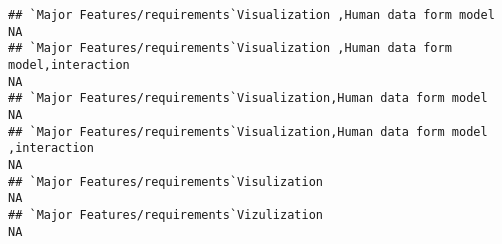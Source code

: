 \documentclass[]{article}
\begin{document}
\begin{verbatim}
## `Major Features/requirements`Visualization ,Human data form model                                                                                                                                                                                                                                                                                                                                                                                                                     NA
## `Major Features/requirements`Visualization ,Human data form model,interaction                                                                                                                                                                                                                                                                                                                                                                                                         NA
## `Major Features/requirements`Visualization,Human data form model                                                                                                                                                                                                                                                                                                                                                                                                                      NA
## `Major Features/requirements`Visualization,Human data form model ,interaction                                                                                                                                                                                                                                                                                                                                                                                                         NA
## `Major Features/requirements`Visulization                                                                                                                                                                                                                                                                                                                                                                                                                                             NA
## `Major Features/requirements`Vizulization                                                                                                                                                                                                                                                                                                                                                                                                                                             NA

\end{verbatim}
\end{document}
